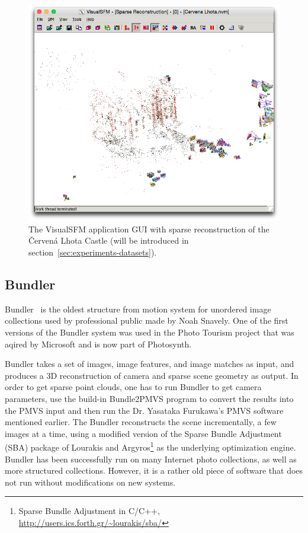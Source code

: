 \begin{figure}[ht]
	\begin{center}
		\includegraphics[keepaspectratio,width=\textwidth]{fig/VisualSFM.png}
	\end{center}
	\caption{The VisualSFM application GUI with sparse reconstruction of the Červená Lhota Castle (will be introduced in section~\ref{sec:experiments-datasets}).}
	\label{fig:visualsfm}
\end{figure}

\subsection*{Bundler}
Bundler~\cite{bundler} is the oldest structure from motion system for unordered image collections used by professional public made by Noah Snavely. One of the first versions of the Bundler system was used in the Photo Tourism project that was aqired by Microsoft and is now part of Photosynth. 

Bundler takes a set of images, image features, and image matches as input, and produces a 3D reconstruction of camera and sparse scene geometry as output. In order to get sparse point clouds, one has to run Bundler to get camera parameters, use the build-in Bundle2PMVS program to convert the results into the PMVS input and then run the Dr. Yasataka Furukawa's PMVS software mentioned earlier. The Bundler reconstructs the scene incrementally, a few images at a time, using a modified version of the Sparse Bundle Adjustment (SBA) package of Lourakis and Argyros\footnote{Sparse Bundle Adjustment in C/C++, \url{http://users.ics.forth.gr/~lourakis/sba/}} as the underlying optimization engine. Bundler has been successfully run on many Internet photo collections, as well as more structured collections. However, it is a rather old piece of software that does not run without modifications on new systems.

